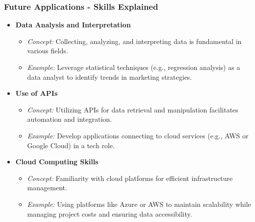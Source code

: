 \documentclass[aspectratio=169]{beamer}
\begin{document}
\begin{frame}[fragile]
    \frametitle{Future Applications - Skills Explained}
    
    \begin{itemize}
        \item \textbf{Data Analysis and Interpretation}
        \begin{itemize}
            \item \textit{Concept:} Collecting, analyzing, and interpreting data is fundamental in various fields.
            \item \textit{Example:} Leverage statistical techniques (e.g., regression analysis) as a data analyst to identify trends in marketing strategies.
        \end{itemize}
        
        \item \textbf{Use of APIs}
        \begin{itemize}
            \item \textit{Concept:} Utilizing APIs for data retrieval and manipulation facilitates automation and integration.
            \item \textit{Example:} Develop applications connecting to cloud services (e.g., AWS or Google Cloud) in a tech role.
        \end{itemize}
        
        \item \textbf{Cloud Computing Skills}
        \begin{itemize}
            \item \textit{Concept:} Familiarity with cloud platforms for efficient infrastructure management.
            \item \textit{Example:} Using platforms like Azure or AWS to maintain scalability while managing project costs and ensuring data accessibility.
        \end{itemize}
    \end{itemize}
\end{frame}
\end{document}
